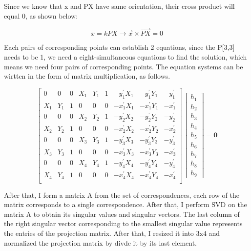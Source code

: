 \documentclass[11pt]{article}
\begin{document}
Since we know that x and PX have same orientation, their cross product will equal 0, as shown below:

\begin{equation}
x = kPX \rightarrow \vec{x} \times \vec{PX} = 0
\end{equation}

Each pairs of corresponding points can establish 2 equations, since the P[3,3] needs to be 1, we need a eight-simultaneous equations to find the solution, which means we need four pairs of corresponding points. The equation systems can be wirtten in the form of matrix multiplication, as follows.

\[
\left[
\begin{array}{ccccccccc}
0 & 0 & 0 & X_1 & Y_1 & 1 & -y_1^\prime X_1 & -y_1^\prime Y_1 & -y_1^\prime \\
X_1 & Y_1 & 1 & 0 & 0 & 0 & -x_1^\prime X_1 & -x_1^\prime Y_1 & -x_1^\prime \\
0 & 0 & 0 & X_2 & Y_2 & 1 & -y_2^\prime X_2 & -y_2^\prime Y_2 & -y_2^\prime \\
X_2 & Y_2 & 1 & 0 & 0 & 0 & -x_2^\prime X_2 & -x_2^\prime Y_2 & -x_2^\prime \\
0 & 0 & 0 & X_3 & Y_3 & 1 & -y_3^\prime X_3 & -y_3^\prime Y_3 & -y_3^\prime \\
X_3 & Y_3 & 1 & 0 & 0 & 0 & -x_3^\prime X_3 & -x_3^\prime Y_3 & -x_3^\prime \\
0 & 0 & 0 & X_4 & Y_4 & 1 & -y_4^\prime X_4 & -y_4^\prime Y_4 & -y_4^\prime \\
X_4 & Y_4 & 1 & 0 & 0 & 0 & -x_4^\prime X_4 & -x_4^\prime Y_4 & -x_4^\prime \\
\end{array}
\right]
\left[
\begin{array}{c}
h_1 \\
h_2 \\
h_3 \\
h_4 \\
h_5 \\
h_6 \\
h_7 \\
h_8 \\
h_9
\end{array}
\right] = \mathbf{0}
\]

After that, I form a matrix A from the set of correspondences, each row of the matrix corresponds to a single correspondence. After that, I perform SVD on the matrix A to obtain its singular values and singular vectors. The last column of the right singular vector corresponding to the smallest singular value represents the entries of the projection matrix. After that, I resized it into 3x4 and normalized the projection matrix by divde it by its last element.
\end{document}

